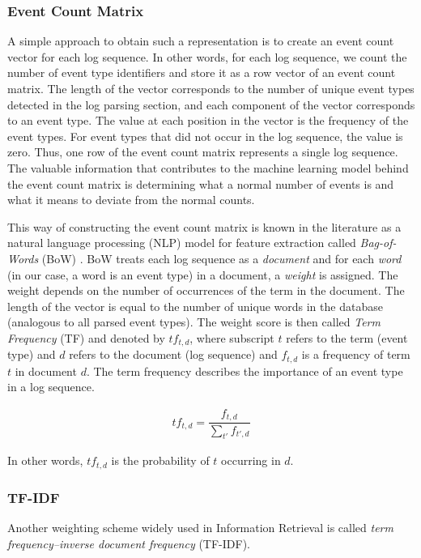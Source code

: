 \subsubsection*{Event Count Matrix}
A simple approach to obtain such a representation is to create an event count vector for each log sequence. In other words, for each log sequence, we count the number of event type identifiers and store it as a row vector of an event count matrix. The length of the vector corresponds to the number of unique event types detected in the log parsing section, and each component of the vector corresponds to an event type. The value at each position in the vector is the frequency of the event types. For event types that did not occur in the log sequence, the value is zero. Thus, one row of the event count matrix represents a single log sequence. The valuable information that contributes to the machine learning model behind the event count matrix is determining what a normal number of events is and what it means to deviate from the normal counts.


This way of constructing the event count matrix is known in the literature as a natural language processing (NLP) model for feature extraction called \textit{Bag-of-Words} (BoW) \cite{informationRetrieval2008}. BoW treats each log sequence as a \textit{document} and for each \textit{word} (in our case, a word is an event type) in a document, a \textit{weight} is assigned. The weight depends on the number of occurrences of the term in the document. The length of the vector is equal to the number of unique words in the database (analogous to all parsed event types). The weight score is then called \textit{Term Frequency} (TF) and denoted by $tf_{t,d}$, where subscript $t$ refers to the term (event type) and $d$ refers to the document (log sequence) and $f_{t,d}$ is a frequency of term $t$ in document $d$. The term frequency describes the importance of an event type in a log sequence.

\begin{gather}
    tf_{t,d} = \dfrac{f_{t,d}}{\sum_{t'}f_{t', d}}
\end{gather}

In other words, $tf_{t, d}$ is the probability of $t$ occurring in $d$.

\subsubsection*{TF-IDF}
Another weighting scheme widely used in Information Retrieval is called \textit{term frequency–inverse document frequency} (TF-IDF). 

